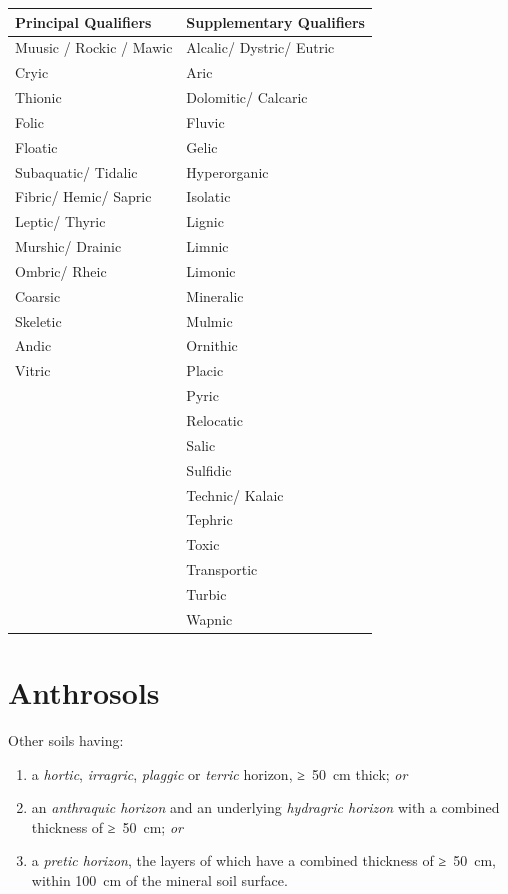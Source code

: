 \documentclass[
  letterpaper,
  DIV=11,
  numbers=noendperiod]{scrreprt}
\providecommand{\tightlist}{%
  \setlength{\itemsep}{0pt}\setlength{\parskip}{0pt}}\usepackage{longtable,booktabs,array}
\begin{document}
\begin{longtable}[]{@{}ll@{}}
\toprule()
Principal Qualifiers & Supplementary Qualifiers \\
\midrule()
\endhead
Muusic / Rockic / Mawic & Alcalic/ Dystric/ Eutric \\
Cryic & Aric \\
Thionic & Dolomitic/ Calcaric \\
Folic & Fluvic \\
Floatic & Gelic \\
Subaquatic/ Tidalic & Hyperorganic \\
Fibric/ Hemic/ Sapric & Isolatic \\
Leptic/ Thyric & Lignic \\
Murshic/ Drainic & Limnic \\
Ombric/ Rheic & Limonic \\
Coarsic & Mineralic \\
Skeletic & Mulmic \\
Andic & Ornithic \\
Vitric & Placic \\
& Pyric \\
& Relocatic \\
& Salic \\
& Sulfidic \\
& Technic/ Kalaic \\
& Tephric \\
& Toxic \\
& Transportic \\
& Turbic \\
& Wapnic \\
\bottomrule()
\end{longtable}


\hypertarget{key-anthrosols}{%
\chapter{Anthrosols}\label{key-anthrosols}}

Other soils having:

\begin{enumerate}
\def\labelenumi{\arabic{enumi}.}
\tightlist
\item
  a \emph{hortic}, \emph{irragric}, \emph{plaggic} or \emph{terric}
  horizon, ≥~50~cm thick; \emph{or}
\item
  an \emph{anthraquic horizon} and an underlying \emph{hydragric
  horizon} with a combined thickness of ≥~50~cm; \emph{or}
\item
  a \emph{pretic horizon}, the layers of which have a combined thickness
  of ≥~50~cm, within 100~cm of the mineral soil surface.
\end{enumerate}
\end{document}
